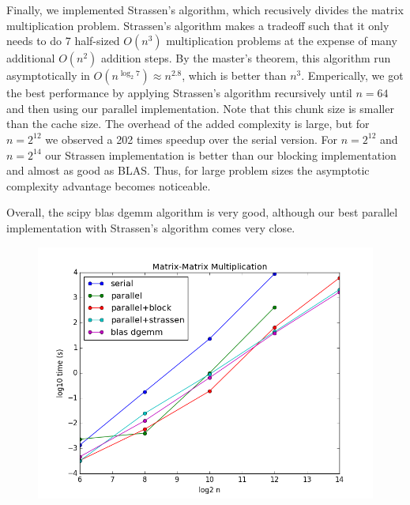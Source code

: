 \documentclass[11pt]{article}
\begin{document}
Finally, we implemented Strassen's algorithm, which recusively divides the matrix multiplication problem.
Strassen's algorithm makes a tradeoff such that it only needs to do 7 half-sized $O(n^3)$ multiplication problems at the expense of many additional $O(n^2)$ addition steps.
By the master's theorem, this algorithm run asymptotically in $O(n^{\log_2 7}) \approx n^{2.8}$, which is better than $n^3$.
Emperically, we got the best performance by applying Strassen's algorithm recursively until $n = 64$ and then using our parallel implementation.
Note that this chunk size is smaller than the cache size.
The overhead of the added complexity is large, but for $n = 2^{12}$ we observed a 202 times speedup over the serial version.
For $n= 2^{12}$ and $n=2^14$ our Strassen implementation is better than our blocking implementation and almost as good as BLAS.
Thus, for large problem sizes the asymptotic complexity advantage becomes noticeable.

Overall, the scipy blas dgemm algorithm is very good, although our best parallel implementation with Strassen's algorithm comes very close.

\begin{figure}[h!]
\includegraphics[width=5in]{problem4.png}
\end{figure}
\end{document}
